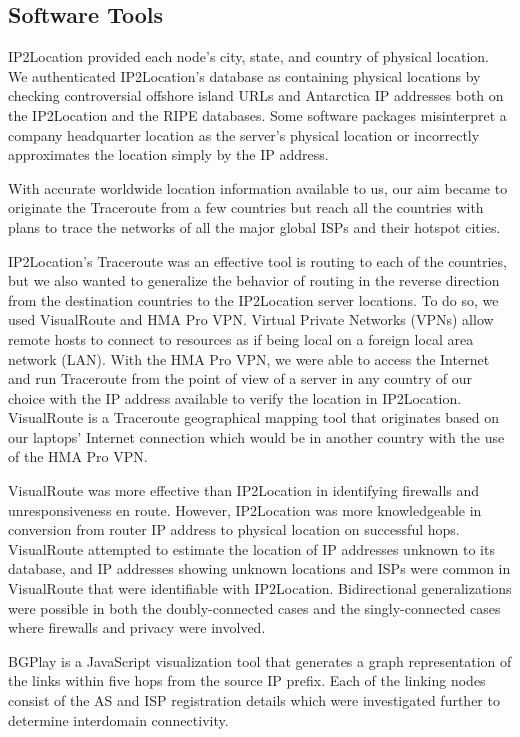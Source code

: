 \documentclass{sigcomm-alternate}
\begin{document}
\subsection{Software Tools}
IP2Location provided each node’s city, state, and country of physical location. We authenticated IP2Location's database as containing physical locations by checking controversial offshore island URLs and Antarctica IP addresses both on the IP2Location and the RIPE databases. Some software packages misinterpret a company headquarter location as the server's physical location or incorrectly approximates the location simply by the IP address.  

With accurate worldwide location information available to us, our aim became to originate the Traceroute from a few countries but reach all the countries with plans to trace the networks of all the major global ISPs and their hotspot cities.

IP2Location's Traceroute was an effective tool is routing to each of the countries, but we also wanted to generalize the behavior of routing in the reverse direction from the destination countries to the IP2Location server locations. To do so, we used VisualRoute and HMA Pro VPN. Virtual Private Networks (VPNs) allow remote hosts to connect to resources as if being local on a foreign local area network (LAN). With the HMA Pro VPN, we were able to access the Internet and run Traceroute from the point of view of a server in any country of our choice with the IP address available to verify the location in IP2Location. VisualRoute is a Traceroute geographical mapping tool that originates based on our laptops' Internet connection which would be in another country with the use of the HMA Pro VPN.

VisualRoute was more effective than IP2Location in identifying firewalls and unresponsiveness en route. However, IP2Location was more knowledgeable in conversion from router IP address to physical location on successful hops. VisualRoute attempted to estimate the location of IP addresses unknown to its database, and IP addresses showing unknown locations and ISPs were common in VisualRoute that were identifiable with IP2Location. Bidirectional generalizations were possible in both the doubly-connected cases and the singly-connected cases where firewalls and privacy were involved.

BGPlay is a JavaScript visualization tool that generates a graph representation of the links within five hops from the source IP prefix. Each of the linking nodes consist of the AS and ISP registration details which were investigated further to determine interdomain connectivity.
\end{document}
